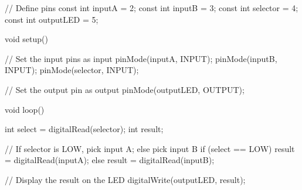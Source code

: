 // Define pins
const int inputA = 2;
const int inputB = 3;
const int selector = 4;
const int outputLED = 5;

void setup() {
  // Set the input pins as input
  pinMode(inputA, INPUT);
  pinMode(inputB, INPUT);
  pinMode(selector, INPUT);

  // Set the output pin as output
  pinMode(outputLED, OUTPUT);
}

void loop() {
  int select = digitalRead(selector);
  int result;

  // If selector is LOW, pick input A; else pick input B
  if (select == LOW) {
    result = digitalRead(inputA);
  } else {
    result = digitalRead(inputB);
  }

  // Display the result on the LED
  digitalWrite(outputLED, result);
}

